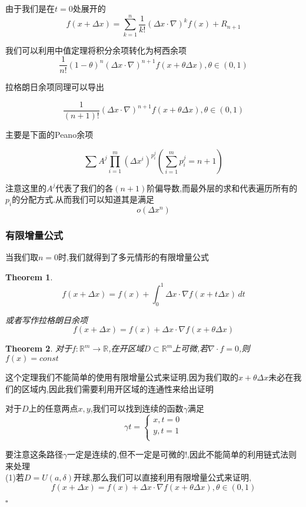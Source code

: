 \documentclass[11pt,hyperref,a4paper,UTF8]{ctexart}
\newtheorem{theorem}{Theorem}[subsection]
\newenvironment{cproof}{%
\heiti{证明}\kaishu
}{%
  \hfill $\square$
  \par\bigskip
}
\newcommand{\RR}{\mathbb{R}}
\begin{document}
\begin{CJK}{UTF8}{gkai}
由于我们是在$t = 0$处展开的
\[f(x + \Delta x) = \sum_{k = 1}^{n} \frac{1}{k !}(\Delta x \cdot \nabla)^k f(x) + R_{n + 1}\]

我们可以利用中值定理将积分余项转化为柯西余项
\[\frac{1}{n !} (1 - \theta)^n (\Delta x \cdot \nabla)^{n + 1}f(x + \theta\Delta x),\theta \in (0,1) \]

拉格朗日余项同理可以导出

\[\frac{1}{(n + 1)!} (\Delta x \cdot \nabla)^{n + 1} f(x + \theta \Delta x),\theta \in (0,1)\]

主要是下面的Peano余项

\[\sum A^j \prod_{i = 1}^{m}(\Delta x^i)^{p_i^j}  (\sum_{i = 1}^{m}p_i^j = n + 1)\]

注意这里的$A^j$代表了我们的各$(n + 1)$阶偏导数,而最外层的求和代表遍历所有的$p_i$的分配方式.从而我们可以知道其是满足
\[o(\Delta x^n)\]
\subsubsection{有限增量公式}
当我们取$n = 0$时,我们就得到了多元情形的有限增量公式

\begin{theorem}
  \[f(x + \Delta x) = f(x) + \int_{0}^{1} \Delta x \cdot \nabla f(x + t\Delta x)\, dt\]

  或者写作拉格朗日余项
  \[f(x + \Delta x) = f(x) + \Delta x \cdot\nabla f(x + \theta\Delta x)\]
\end{theorem}

\begin{theorem}
  对于$f: \RR^m \to \RR$,在开区域$D \subset \RR^m$上可微,若$\nabla \cdot f = 0$,则$f(x) = const$
\end{theorem}
这个定理我们不能简单的使用有限增量公式来证明,因为我们取的$x + \theta \Delta x$未必在我们的区域内,因此我们需要利用开区域的连通性来给出证明
\begin{cproof}
  对于$D$上的任意两点$x,y$,我们可以找到连续的函数$\gamma$满足
  \[\gamma t = \begin{cases}
    x ,t = 0\\
    y, t = 1\\
  \end{cases}\] 

  要注意这条路径$\gamma$一定是连续的,但不一定是可微的!,因此不能简单的利用链式法则来处理\\

  (1)若$D = U(a,\delta)$开球,那么我们可以直接利用有限增量公式来证明,
  \[f(x + \Delta x) = f(x) + \Delta x \cdot \nabla f(x + \theta \Delta x) ,\theta \in (0,1)\]


\end{cproof}
\end{CJK}
\end{document}
